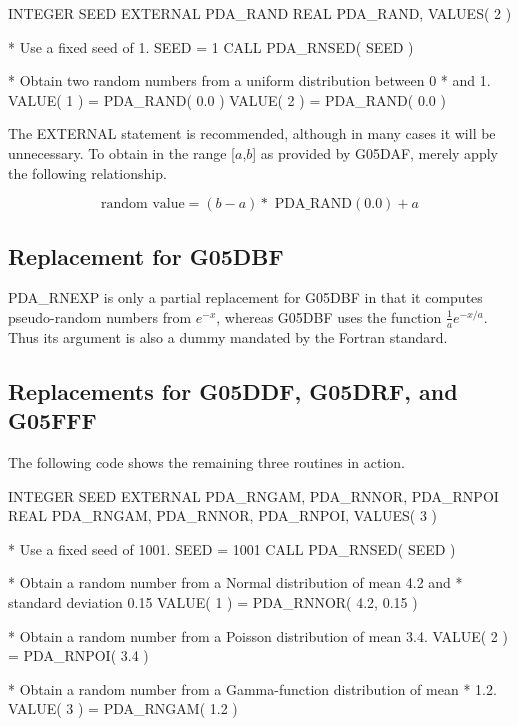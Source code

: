 \documentclass[11pt,twoside,nolof]{starlink}
\begin{document}
\begin{terminalv}
      INTEGER SEED
      EXTERNAL PDA_RAND
      REAL PDA_RAND, VALUES( 2 )

*  Use a fixed seed of 1.
      SEED = 1
      CALL PDA_RNSED( SEED )

*  Obtain two random numbers from a uniform distribution between 0
*  and 1.
      VALUE( 1 ) = PDA_RAND( 0.0 )
      VALUE( 2 ) = PDA_RAND( 0.0 )
\end{terminalv}

   The EXTERNAL statement is recommended, although in many cases it
   will be unnecessary.  To obtain  in the range [$a$,$b$] as
   provided by G05DAF, merely apply the following relationship.

   \[  \mbox{random value} = (b - a) * \mbox{ PDA\_RAND}( 0.0 ) + a \]

\subsection{Replacement for G05DBF}

   PDA\_RNEXP is only a partial replacement for G05DBF in that it
   computes pseudo-random numbers from $e^{-x}$, whereas G05DBF
   uses the function $\frac{1}{a}e^{-x/a}$.  Thus its argument is
   also a dummy mandated by the Fortran standard.

\subsection{Replacements for G05DDF, G05DRF, and G05FFF}

The following code shows the remaining three routines in action.

\begin{terminalv}
      INTEGER SEED
      EXTERNAL PDA_RNGAM, PDA_RNNOR, PDA_RNPOI
      REAL PDA_RNGAM, PDA_RNNOR, PDA_RNPOI, VALUES( 3 )

*  Use a fixed seed of 1001.
      SEED = 1001
      CALL PDA_RNSED( SEED )

*  Obtain a random number from a Normal distribution of mean 4.2 and
*  standard deviation 0.15
      VALUE( 1 ) = PDA_RNNOR( 4.2, 0.15 )

*  Obtain a random number from a Poisson distribution of mean 3.4.
      VALUE( 2 ) = PDA_RNPOI( 3.4 )

*  Obtain a random number from a Gamma-function distribution of mean
*  1.2.
      VALUE( 3 ) = PDA_RNGAM( 1.2 )
\end{terminalv}
\end{document}
